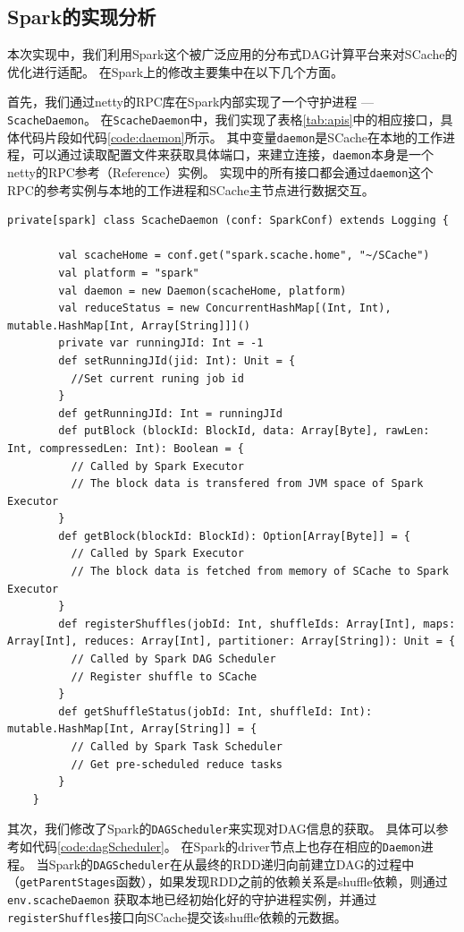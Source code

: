 \subsection{Spark的实现分析}
\label{sec:sparkimpl}
本次实现中，我们利用Spark这个被广泛应用的分布式DAG计算平台来对SCache的优化进行适配。
在Spark上的修改主要集中在以下几个方面。

首先，我们通过netty\cite{netty}的RPC库在Spark内部实现了一个守护进程 --- \verb|ScacheDaemon|。
在\verb|ScacheDaemon|中，我们实现了表格\ref{tab:apis}中的相应接口，具体代码片段如代码\ref{code:daemon}所示。
其中变量\verb|daemon|是SCache在本地的工作进程，可以通过读取配置文件来获取具体端口，来建立连接，\verb|daemon|本身是一个netty的RPC参考（Reference）实例。
实现中的所有接口都会通过\verb|daemon|这个RPC的参考实例与本地的工作进程和SCache主节点进行数据交互。

\begin{lstlisting}[style={myScalastyle}, caption={ScacheDaemon代码片段}, label={code:daemon}]
    private[spark] class ScacheDaemon (conf: SparkConf) extends Logging {

        val scacheHome = conf.get("spark.scache.home", "~/SCache")
        val platform = "spark"  
        val daemon = new Daemon(scacheHome, platform)   
        val reduceStatus = new ConcurrentHashMap[(Int, Int), mutable.HashMap[Int, Array[String]]]() 
        private var runningJId: Int = -1    
        def setRunningJId(jid: Int): Unit = {
          //Set current runing job id
        }   
        def getRunningJId: Int = runningJId 
        def putBlock (blockId: BlockId, data: Array[Byte], rawLen: Int, compressedLen: Int): Boolean = {
          // Called by Spark Executor
          // The block data is transfered from JVM space of Spark Executor
        }   
        def getBlock(blockId: BlockId): Option[Array[Byte]] = {
          // Called by Spark Executor
          // The block data is fetched from memory of SCache to Spark Executor
        }   
        def registerShuffles(jobId: Int, shuffleIds: Array[Int], maps: Array[Int], reduces: Array[Int], partitioner: Array[String]): Unit = {
          // Called by Spark DAG Scheduler
          // Register shuffle to SCache
        }   
        def getShuffleStatus(jobId: Int, shuffleId: Int): mutable.HashMap[Int, Array[String]] = {
          // Called by Spark Task Scheduler
          // Get pre-scheduled reduce tasks
        }   
    }
\end{lstlisting}

其次，我们修改了Spark的\verb|DAGScheduler|来实现对DAG信息的获取。
具体可以参考如代码\ref{code:dagScheduler}。
在Spark的driver节点上也存在相应的\verb|Daemon|进程。
当Spark的\verb|DAGScheduler|在从最终的RDD递归向前建立DAG的过程中（\verb|getParentStages|函数），如果发现RDD之前的依赖关系是shuffle依赖，则通过\verb|env.scacheDaemon|
获取本地已经初始化好的守护进程实例，并通过\verb|registerShuffles|接口向SCache提交该shuffle依赖的元数据。

